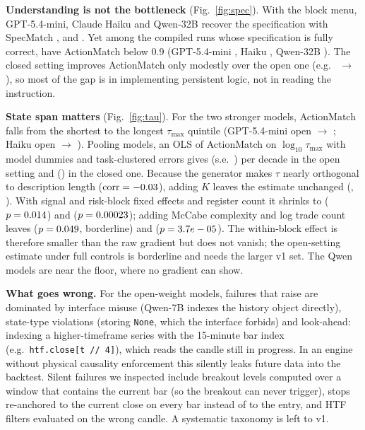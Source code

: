 \documentclass[sigconf,anonymous,review]{acmart}
\begin{document}
\begin{table}[t]\centering\scriptsize\setlength{\tabcolsep}{3pt}
\caption{Same \NSub{} tasks (40 per $\tau_{\max}$ quintile), open setting. ActionMatch and the
quintile columns are over compiled runs; Exact and Silent are shares of all tasks.}
\label{tab:frontier}

\end{table}

\textbf{Understanding is not the bottleneck} (Fig.~\ref{fig:spec}). With the block menu, GPT-5.4-mini,
Claude Haiku and Qwen-32B recover the specification with SpecMatch \SpecMatchGptClosed,
\SpecMatchHaikuClosed{} and \SpecMatchQwenLClosed. Yet among the \NSpecOne{} compiled runs whose
specification is fully correct, \SpecOneBehaviourWrong{} have ActionMatch below 0.9
(GPT-5.4-mini \SpecOneWrongGpt, Haiku \SpecOneWrongHaiku, Qwen-32B \SpecOneWrongQwenL). The closed
setting improves ActionMatch only modestly over the open one (e.g.\ \ActionMatchGptOpen{} $\to$
\ActionMatchGptClosed), so most of the gap is in implementing persistent logic, not in reading
the instruction.

\textbf{State span matters} (Fig.~\ref{fig:tau}). For the two stronger models, ActionMatch falls
from the shortest to the longest $\tau_{\max}$ quintile (GPT-5.4-mini open \AMQoneGptOpen{} $\to$
\AMQfiveGptOpen; Haiku open \AMQoneHaikuOpen{} $\to$ \AMQfiveHaikuOpen). Pooling models, an OLS of
ActionMatch on $\log_{10}\tau_{\max}$ with model dummies and task-clustered errors gives
\RegOpenTauOnlyTau{} (s.e.\ \RegOpenTauOnlyTauSE) per decade in the open setting and
\RegClosedTauOnlyTau{} (\RegClosedTauOnlyTauSE) in the closed one. Because the generator makes
$\tau$ nearly orthogonal to description length ($\mathrm{corr}=-0.03$), adding $K$ leaves the
estimate unchanged (\RegOpenTauKTau, \RegClosedTauKTau). With signal and risk-block fixed effects and
register count it shrinks to \RegOpenTauKFeTau{} ($p=0.014$) and \RegClosedTauKFeTau{}
($p=0.00023$); adding McCabe complexity and log trade count leaves \RegOpenTauKFeControlsTau{}
($p=0.049$, borderline) and \RegClosedTauKFeControlsTau{}
($p=3.7e-05$). The within-block effect is therefore smaller than the raw
gradient but does not vanish; the open-setting estimate under full controls is borderline and
needs the larger v1 set. The Qwen models are near the floor, where no gradient can show.

\textbf{What goes wrong.} For the open-weight models, failures that raise are dominated by
interface misuse (Qwen-7B indexes the history object directly), state-type violations (storing
\texttt{None}, which the interface forbids) and look-ahead: indexing a higher-timeframe series
with the 15-minute bar index (e.g.\ \texttt{htf.close[t // 4]}), which reads the candle still in
progress. In an engine without physical causality enforcement this silently leaks future data
into the backtest. Silent failures we inspected include breakout levels computed over a window that
contains the current bar (so the breakout can never trigger), stops re-anchored to the current
close on every bar instead of to the entry, and HTF filters evaluated on the wrong candle. A
systematic taxonomy is left to v1.
\end{document}
